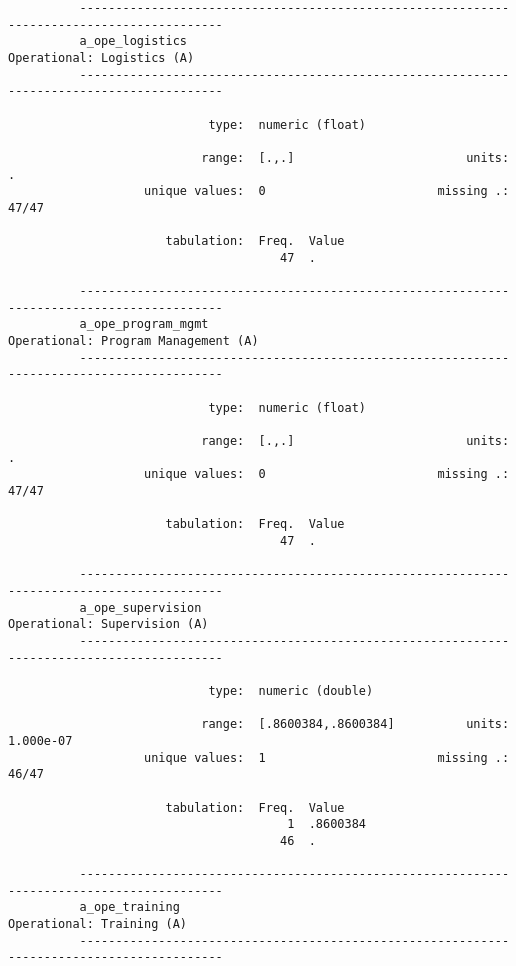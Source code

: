 \documentclass{article}
\begin{document}
\begin{verbatim}
          ------------------------------------------------------------------------------------------
          a_ope_logistics                                                 Operational: Logistics (A)
          ------------------------------------------------------------------------------------------
          
                            type:  numeric (float)
          
                           range:  [.,.]                        units:  .
                   unique values:  0                        missing .:  47/47
          
                      tabulation:  Freq.  Value
                                      47  .
          
          ------------------------------------------------------------------------------------------
          a_ope_program_mgmt                                     Operational: Program Management (A)
          ------------------------------------------------------------------------------------------
          
                            type:  numeric (float)
          
                           range:  [.,.]                        units:  .
                   unique values:  0                        missing .:  47/47
          
                      tabulation:  Freq.  Value
                                      47  .
          
          ------------------------------------------------------------------------------------------
          a_ope_supervision                                             Operational: Supervision (A)
          ------------------------------------------------------------------------------------------
          
                            type:  numeric (double)
          
                           range:  [.8600384,.8600384]          units:  1.000e-07
                   unique values:  1                        missing .:  46/47
          
                      tabulation:  Freq.  Value
                                       1  .8600384
                                      46  .
          
          ------------------------------------------------------------------------------------------
          a_ope_training                                                   Operational: Training (A)
          ------------------------------------------------------------------------------------------
          

\end{verbatim}
\end{document}
